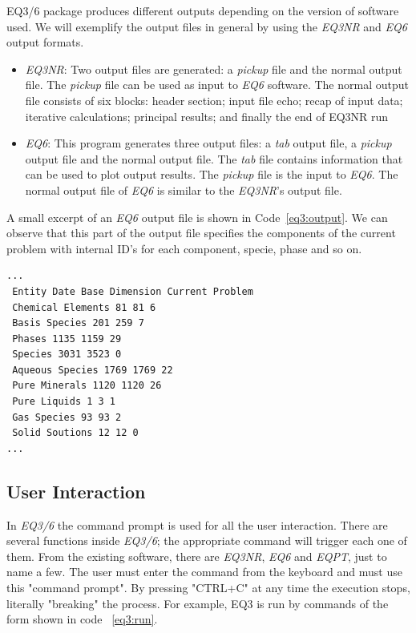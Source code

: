 EQ3/6 package produces different outputs depending on the version of software used. We will exemplify the output files in general by using the \emph{EQ3NR} and \emph{EQ6} output formats. 
\begin{itemize}
\item \emph{EQ3NR}: Two output files are generated: a \emph{pickup} file and the normal output file. The \emph{pickup} file can be used as input to \emph{EQ6} software. The normal output file consists of six blocks: header section; input file echo; recap of input data; iterative calculations; principal results; and finally the end of EQ3NR run
\item \emph{EQ6}: This program generates three output files: a \emph{tab} output file, a \emph{pickup} output file and the normal output file. The \emph{tab} file contains information that can be used to plot output results. The \emph{pickup} file is the input to \emph{EQ6}. The normal output file of \emph{EQ6} is similar to the \emph{EQ3NR}'s output file.
\end{itemize}

A small excerpt of an \emph{EQ6} output file is shown in Code~\ref{eq3:output}. We can observe that this part of the output file specifies the components of the current problem with internal ID's for each component, specie, phase and so on.

\begin{minipage}[c]{0.92\textwidth}
\begin{lstlisting}[frame=single, caption=Excerpt of \emph{EQ6} output file, label=eq3:output]
...
 Entity Date Base Dimension Current Problem
 Chemical Elements 81 81 6
 Basis Species 201 259 7
 Phases 1135 1159 29
 Species 3031 3523 0
 Aqueous Species 1769 1769 22
 Pure Minerals 1120 1120 26
 Pure Liquids 1 3 1
 Gas Species 93 93 2
 Solid Soutions 12 12 0
...
\end{lstlisting}
\end{minipage}

\subsection{User Interaction}
In \emph{EQ3/6} the command prompt is used for all the user interaction. There are several functions inside \emph{EQ3/6}; the appropriate command will trigger each one of them. From the existing software, there are \emph{EQ3NR}, \emph{EQ6} and \emph{EQPT}, just to name a few. The user must enter the command from the keyboard and must use this "command prompt". By pressing "CTRL+C" at any time the execution stops, literally "breaking" the process. For example, EQ3 is run by commands of the form shown in code ~\ref{eq3:run}.


